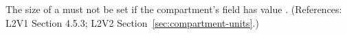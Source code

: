 The size of a \Compartment must not be set if the compartment's
 field has value . (References: L2V1
Section 4.5.3; L2V2 Section~\ref{sec:compartment-units}.)

